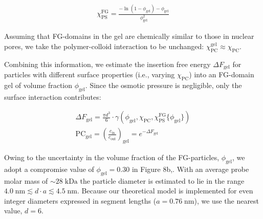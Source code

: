 \documentclass[10pt, a4paper, twocolumn]{article}
\begin{document}
\begin{eqnarray}
    \chi_{\text{PS}}^{\text{FG}} = \frac{-\ln(1-\phi_{\text{gel}}) - \phi_{\text{gel}}}{\phi_{\text{gel}}^2}
\end{eqnarray}

Assuming that FG-domains in the gel are chemically similar to those in nuclear pores, we take the polymer-colloid interaction to be unchanged: $\chi_{\text{PC}}^{\text{gel}} \approx \chi_{\text{PC}}$.

Combining this information, we estimate the insertion free energy $\Delta F_{\text{gel}}$ for particles with different surface properties (i.e., varying $\chi_{\text{PC}}$) into an FG-domain gel of volume fraction $\phi_{\text{gel}}$.
Since the osmotic pressure is negligible, only the surface interaction contributes:

\begin{eqnarray}
    \Delta F_{\text{gel}} =
    \frac{\pi d^3}{6} \cdot \gamma\left(
    \phi_{\text{gel}}, \chi_{\text{PC}},
    \chi_{\text{PS}}^{\text{FG}}\{ \phi_{\text{gel}} \}
    \right) \\
    \text{PC}_{\text{gel}} = \left(\frac{c_{\text{in}}}{c_{\text{out}}}\right)_{\text{gel}} = e^{-\Delta F_{\text{gel}}}
\end{eqnarray}

Owing to the uncertainty in the volume fraction of the FG-particles, $\phi_{\text{gel}}$, we adopt a compromise value of $\phi_{\text{gel}} = 0.30$ in Figure 8b,.  
With an average probe molar mass of \(\sim\!28\;\text{kDa}\) the particle diameter is estimated to lie in the range  $4.0\;\text{nm} \lesssim d\cdot a \lesssim 4.5\;\text{nm}$.
Because our theoretical model is implemented for even integer diameters expressed in segment lengths ($a = 0.76\;\text{nm}$), we use the
nearest value, $d = 6$.
\end{document}
